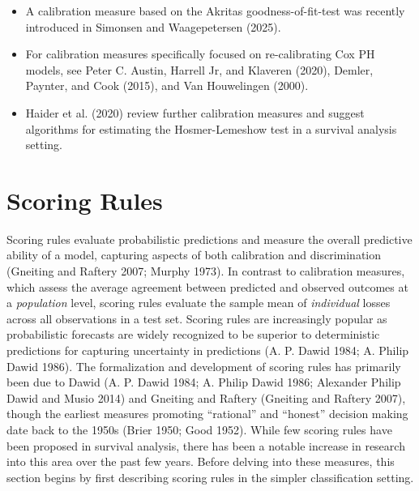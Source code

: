 \documentclass[
  letterpaper,
  krantz2]{style/krantz}
\providecommand{\tightlist}{%
  \setlength{\itemsep}{0pt}\setlength{\parskip}{0pt}}
\begin{document}
\begin{tcolorbox}[enhanced jigsaw, toprule=.15mm, bottomtitle=1mm, opacityback=0, breakable, leftrule=.75mm, title={Further reading}, toptitle=1mm, bottomrule=.15mm, colback=white, colframe=quarto-callout-tip-color-frame, titlerule=0mm, opacitybacktitle=0.6, coltitle=black, rightrule=.15mm, left=2mm, colbacktitle=quarto-callout-tip-color!10!white, arc=.35mm]

\begin{itemize}
\tightlist
\item
  A calibration measure based on the Akritas goodness-of-fit-test was
  recently introduced in Simonsen and Waagepetersen (2025).
\item
  For calibration measures specifically focused on re-calibrating Cox PH
  models, see Peter C. Austin, Harrell Jr, and Klaveren (2020), Demler,
  Paynter, and Cook (2015), and Van Houwelingen (2000).
\item
  Haider et al. (2020) review further calibration measures and suggest
  algorithms for estimating the Hosmer-Lemeshow test in a survival
  analysis setting.
\end{itemize}

\end{tcolorbox}

\chapter{Scoring Rules}\label{sec-rules}

Scoring rules evaluate probabilistic predictions
and measure the overall predictive ability of a model, capturing aspects
of both calibration and
discrimination (Gneiting and Raftery 2007; Murphy
1973). In contrast to calibration measures, which assess the average
agreement between predicted and observed outcomes at a \emph{population}
level, scoring rules evaluate the sample mean of \emph{individual}
losses across all observations in a test set. Scoring rules are
increasingly popular as probabilistic forecasts are widely recognized to
be superior to deterministic predictions for capturing uncertainty in
predictions (A. P. Dawid 1984; A. Philip Dawid 1986). The formalization
and development of scoring rules has primarily been due to Dawid (A. P.
Dawid 1984; A. Philip Dawid 1986; Alexander Philip Dawid and Musio 2014)
and Gneiting and Raftery (Gneiting and Raftery 2007), though the
earliest measures promoting ``rational'' and ``honest'' decision making
date back to the 1950s (Brier 1950; Good 1952). While few scoring rules
have been proposed in survival analysis, there has been a notable
increase in research into this area over the past few years. Before
delving into these measures, this section begins by first describing
scoring rules in the simpler classification
setting.
\end{document}
